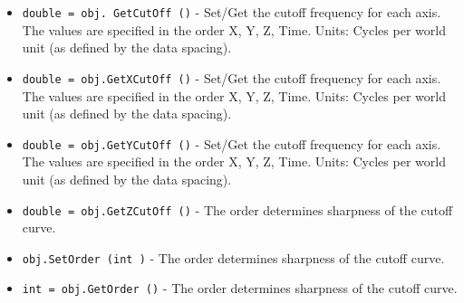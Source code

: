 \begin{itemize}
\item  \verb|double = obj. GetCutOff ()| -  Set/Get the cutoff frequency for each axis.
 The values are specified in the order X, Y, Z, Time.
 Units: Cycles per world unit (as defined by the data spacing).

\item  \verb|double = obj.GetXCutOff ()| -  Set/Get the cutoff frequency for each axis.
 The values are specified in the order X, Y, Z, Time.
 Units: Cycles per world unit (as defined by the data spacing).

\item  \verb|double = obj.GetYCutOff ()| -  Set/Get the cutoff frequency for each axis.
 The values are specified in the order X, Y, Z, Time.
 Units: Cycles per world unit (as defined by the data spacing).

\item  \verb|double = obj.GetZCutOff ()| -  The order determines sharpness of the cutoff curve.

\item  \verb|obj.SetOrder (int )| -  The order determines sharpness of the cutoff curve.

\item  \verb|int = obj.GetOrder ()| -  The order determines sharpness of the cutoff curve.

\end{itemize}
